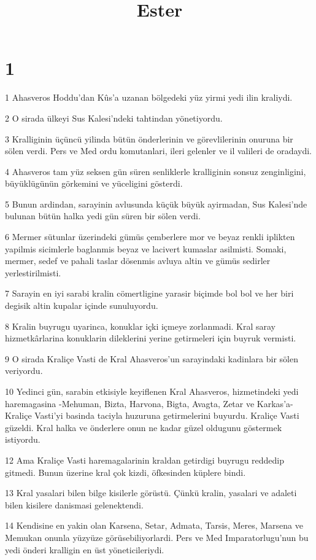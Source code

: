 

\title{Ester}


\chapter{1}

\par 1 Ahasveros Hoddu'dan Kûs'a uzanan bölgedeki yüz yirmi yedi ilin kraliydi.
\par 2 O sirada ülkeyi Sus Kalesi'ndeki tahtindan yönetiyordu.
\par 3 Kralliginin üçüncü yilinda bütün önderlerinin ve görevlilerinin onuruna bir sölen verdi. Pers ve Med ordu komutanlari, ileri gelenler ve il valileri de oradaydi.
\par 4 Ahasveros tam yüz seksen gün süren senliklerle kralliginin sonsuz zenginligini, büyüklügünün görkemini ve yüceligini gösterdi.
\par 5 Bunun ardindan, sarayinin avlusunda küçük büyük ayirmadan, Sus Kalesi'nde bulunan bütün halka yedi gün süren bir sölen verdi.
\par 6 Mermer sütunlar üzerindeki gümüs çemberlere mor ve beyaz renkli iplikten yapilmis sicimlerle baglanmis beyaz ve lacivert kumaslar asilmisti. Somaki, mermer, sedef ve pahali taslar dösenmis avluya altin ve gümüs sedirler yerlestirilmisti.
\par 7 Sarayin en iyi sarabi kralin cömertligine yarasir biçimde bol bol ve her biri degisik altin kupalar içinde sunuluyordu.
\par 8 Kralin buyrugu uyarinca, konuklar içki içmeye zorlanmadi. Kral saray hizmetkârlarina konuklarin dileklerini yerine getirmeleri için buyruk vermisti.
\par 9 O sirada Kraliçe Vasti de Kral Ahasveros'un sarayindaki kadinlara bir sölen veriyordu.
\par 10 Yedinci gün, sarabin etkisiyle keyiflenen Kral Ahasveros, hizmetindeki yedi haremagasina -Mehuman, Bizta, Harvona, Bigta, Avagta, Zetar ve Karkas'a- Kraliçe Vasti'yi basinda taciyla huzuruna getirmelerini buyurdu. Kraliçe Vasti güzeldi. Kral halka ve önderlere onun ne kadar güzel oldugunu göstermek istiyordu.
\par 12 Ama Kraliçe Vasti haremagalarinin kraldan getirdigi buyrugu reddedip gitmedi. Bunun üzerine kral çok kizdi, öfkesinden küplere bindi.
\par 13 Kral yasalari bilen bilge kisilerle görüstü. Çünkü kralin, yasalari ve adaleti bilen kisilere danismasi gelenektendi.
\par 14 Kendisine en yakin olan Karsena, Setar, Admata, Tarsis, Meres, Marsena ve Memukan onunla yüzyüze görüsebiliyorlardi. Pers ve Med Imparatorlugu'nun bu yedi önderi kralligin en üst yöneticileriydi.
